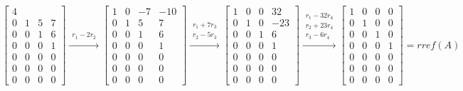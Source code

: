 \documentclass{article}
\begin{document}
\[\begin{bmatrix}
 4\\
0 & 1 & 5 & 7\\
0 & 0 & 1 & 6\\
0 & 0 & 0 & 1\\
0 & 0 & 0 & 0\\
0 & 0 & 0 & 0\\
0 & 0 & 0 & 0
\end{bmatrix}\xrightarrow{\begin{matrix}r_1-2r_2\end{matrix}}
\begin{bmatrix}
1 & 0 & -7 & -10\\
0 & 1 & 5 & 7\\
0 & 0 & 1 & 6\\
0 & 0 & 0 & 1\\
0 & 0 & 0 & 0\\
0 & 0 & 0 & 0\\
0 & 0 & 0 & 0
\end{bmatrix}\xrightarrow{\begin{matrix}r_1+7r_3\\r_2-5r_3\end{matrix}}
\begin{bmatrix}
1 & 0 & 0 & 32\\
0 & 1 & 0 & -23\\
0 & 0 & 1 & 6\\
0 & 0 & 0 & 1\\
0 & 0 & 0 & 0\\
0 & 0 & 0 & 0\\
0 & 0 & 0 & 0
\end{bmatrix}\xrightarrow{\begin{matrix}r_1-32r_4\\r_2+23r_4\\r_3-6r_4\end{matrix}}
\begin{bmatrix}
1 & 0 & 0 & 0\\
0 & 1 & 0 & 0\\
0 & 0 & 1 & 0\\
0 & 0 & 0 & 1\\
0 & 0 & 0 & 0\\
0 & 0 & 0 & 0\\
0 & 0 & 0 & 0
\end{bmatrix}=rref(A)
\] 
\end{document}
